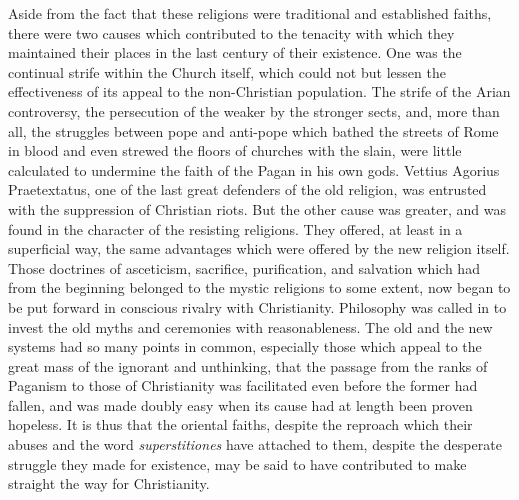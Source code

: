 \documentclass[a4paper, 11pt, oneside, polutonikogreek, english]{article}
\begin{document}
Aside from the fact that these religions were traditional and established faiths, there were two causes which contributed to the tenacity with which they maintained their places in the last century of their existence. One was the continual strife within the Church itself, which could not but lessen the effectiveness of its appeal to the non-Christian population. The strife of the Arian controversy, the persecution of the weaker by the stronger sects, and, more than all, the struggles between pope and anti-pope which bathed the streets of Rome in blood and even strewed the floors of churches with the slain, were little calculated to undermine the faith of the Pagan in his own gods. Vettius Agorius Praetextatus, one of the last great defenders of the old religion, was entrusted with the suppression of Christian riots. But the other cause was greater, and was found in the character of the resisting religions. They offered, at least in a superficial way, the same advantages which were offered by the new religion itself. Those doctrines of asceticism, sacrifice, purification, and salvation which had from the beginning belonged to the mystic religions to some extent, now began to be put forward in conscious rivalry with Christianity. Philosophy was called in to invest the old myths and ceremonies with reasonableness. The old and the new systems had so many points in common, especially those which appeal to the great mass of the ignorant and unthinking, that the passage from the ranks of Paganism to those of Christianity was facilitated even before the former had fallen, and was made doubly easy when its cause had at length been proven hopeless. It is thus that the oriental faiths, despite the reproach which their abuses and the word \emph{superstitiones} have attached to them, despite the desperate struggle they made for existence, may be said to have contributed to make straight the way for Christianity.
\end{document}
